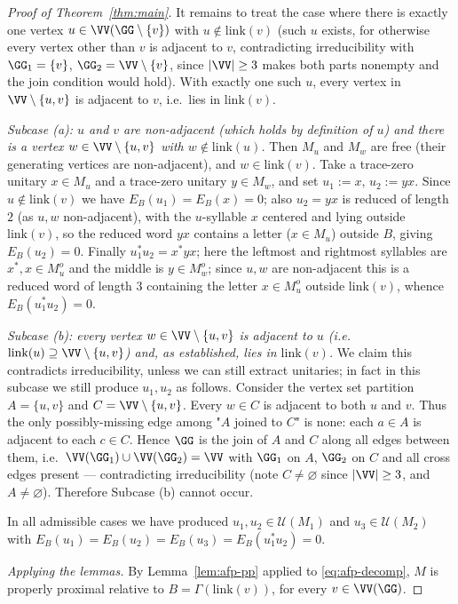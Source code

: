\begin{proof}[Proof of Theorem~\ref{thm:main}]
It remains to treat the case where there is exactly one vertex
$u\in\VV(\GG\setminus\{v\})$ with $u\notin\mathrm{link}(v)$ (such $u$ exists, for otherwise
every vertex other than $v$ is adjacent to $v$, contradicting irreducibility with
$\GG_1=\{v\}$, $\GG_2=\VV\setminus\{v\}$, since $|\VV|\ge 3$ makes both parts nonempty and the
join condition would hold). With exactly one such $u$, every vertex in
$\VV\setminus\{u,v\}$ is adjacent to $v$, i.e.\ lies in $\mathrm{link}(v)$.

\emph{Subcase (a): $u$ and $v$ are non-adjacent (which holds by definition of $u$) and there
is a vertex $w\in\VV\setminus\{u,v\}$ with $w\notin\mathrm{link}(u)$.} Then $M_u$ and $M_w$
are free (their generating vertices are non-adjacent), and $w\in\mathrm{link}(v)$. Take a
trace-zero unitary $x\in M_u$ and a trace-zero unitary $y\in M_w$, and set
$u_1:=x$, $u_2:=yx$. Since $u\notin\mathrm{link}(v)$ we have $E_B(u_1)=E_B(x)=0$; also
$u_2=yx$ is reduced of length $2$ (as $u,w$ non-adjacent), with the $u$-syllable $x$
centered and lying outside $\mathrm{link}(v)$, so the reduced word $yx$ contains a letter
($x\in M_u$) outside $B$, giving $E_B(u_2)=0$. Finally $u_1^*u_2=x^*yx$; here the leftmost
and rightmost syllables are $x^*,x\in M_u^o$ and the middle is $y\in M_w^o$; since $u,w$ are
non-adjacent this is a reduced word of length $3$ containing the letter $x\in M_u^o$ outside
$\mathrm{link}(v)$, whence $E_B(u_1^*u_2)=0$.

\emph{Subcase (b): every vertex $w\in\VV\setminus\{u,v\}$ is adjacent to $u$ (i.e.\
$\mathrm{link}(u)\supseteq\VV\setminus\{u,v\}$) and, as established, lies in
$\mathrm{link}(v)$.} We claim this contradicts irreducibility, unless we can still extract
unitaries; in fact in this subcase we still produce $u_1,u_2$ as follows. Consider the
vertex set partition $A=\{u,v\}$ and $C=\VV\setminus\{u,v\}$. Every $w\in C$ is adjacent to
both $u$ and $v$. Thus the only possibly-missing edge among "$A$ joined to $C$" is none: each
$a\in A$ is adjacent to each $c\in C$. Hence $\GG$ is the join of $A$ and $C$ along all edges
between them, i.e.\ $\VV(\GG_1)\cup\VV(\GG_2)=\VV$ with $\GG_1$ on $A$, $\GG_2$ on $C$ and
all cross edges present — contradicting irreducibility (note $C\ne\varnothing$ since
$|\VV|\ge 3$, and $A\ne\varnothing$). Therefore Subcase (b) cannot occur.

In all admissible cases we have produced $u_1,u_2\in\mathcal U(M_1)$ and
$u_3\in\mathcal U(M_2)$ with $E_B(u_1)=E_B(u_2)=E_B(u_3)=E_B(u_1^*u_2)=0$.

\medskip
\emph{Applying the lemmas.}
By Lemma~\ref{lem:afp-pp} applied to \eqref{eq:afp-decomp}, $M$ is properly proximal relative
to $B=\Gamma(\mathrm{link}(v))$, for every $v\in\VV(\GG)$.


\end{proof}
